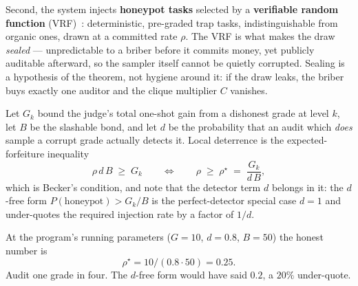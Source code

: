 \documentclass[11pt,a4paper]{article}
\theoremstyle{definition}
\begin{document}
Second, the system injects \textbf{honeypot tasks} selected by a
\textbf{verifiable random function} (VRF)~: deterministic, pre-graded
trap tasks, indistinguishable from organic ones, drawn at a committed rate $\rho$.
The VRF is what makes the draw \emph{sealed} --- unpredictable to a briber before
it commits money, yet publicly auditable afterward, so the sampler itself cannot be
quietly corrupted. Sealing is a hypothesis of the theorem, not hygiene around it:
if the draw leaks, the briber buys exactly one auditor and the clique multiplier
$C$ vanishes.



Let $G_k$ bound the judge's total one-shot gain from a dishonest grade at level
$k$, let $B$ be the slashable bond, and let $d$ be the probability that an audit
which \emph{does} sample a corrupt grade actually detects it. Local deterrence is
the expected-forfeiture inequality
\[
  \rho\, d\, B \;\ge\; G_k
  \qquad\Longleftrightarrow\qquad
  \rho \;\ge\; \rho^\star \;=\; \frac{G_k}{d\,B},
\]
which is Becker's condition, and note that the detector term $d$ belongs in it: the
$d$-free form $P(\text{honeypot}) > G_k/B$ is the perfect-detector special case
$d=1$ and under-quotes the required injection rate by a factor of $1/d$.

At the program's running parameters ($G=10$, $d=0.8$, $B=50$) the honest number is
\[
  \rho^\star = 10/(0.8\cdot 50) = 0.25.
\]
Audit one grade in four. The $d$-free form would have said $0.2$, a $20\%$
under-quote.
\end{document}
